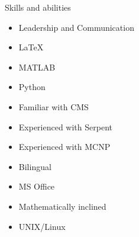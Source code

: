 \begin{ResumeSection}{Skills and abilities}
    \begin{multicols}{2}
        \begin{itemize}
            \item Leadership and Communication 
            \item \LaTeX
            \item MATLAB
            \item Python 
            \item Familiar with CMS
            \item Experienced with Serpent
            \item Experienced with MCNP
            \item Bilingual
            \item MS Office 
            \item Mathematically inclined
            \item UNIX/Linux 
        \end{itemize}
    \end{multicols}
\end{ResumeSection}
